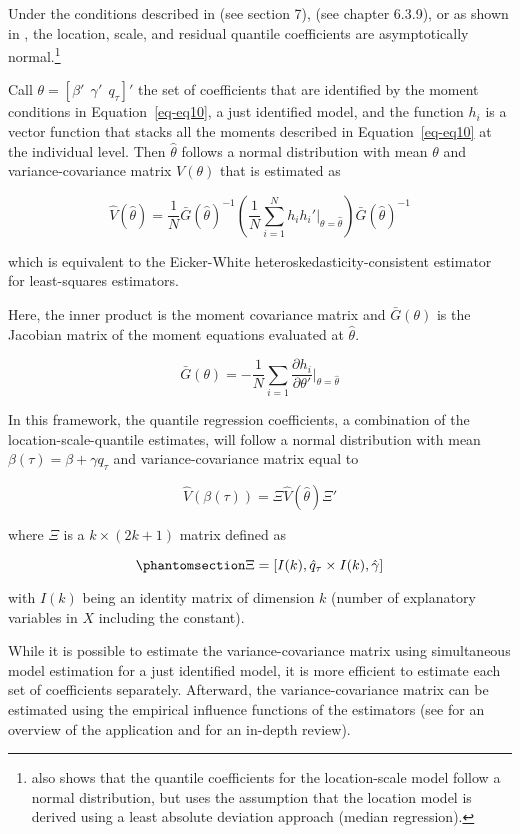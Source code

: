 \documentclass[
  12pt,
  oneside]{article}
\begin{document}
Under the conditions described in \citet{newey_chapter_1994} (see
section 7), \citet{cameron2005} (see chapter 6.3.9), or as shown in
\citet{mss2019}, the location, scale, and residual quantile coefficients
are asymptotically normal.\footnote{\citet{zhao2000} also shows that the
  quantile coefficients for the location-scale model follow a normal
  distribution, but uses the assumption that the location model is
  derived using a least absolute deviation approach (median regression).}

Call \(\theta=[ \beta' \ \ \gamma' \ \ q_\tau ]'\) the set of
coefficients that are identified by the moment conditions in
Equation~\ref{eq-eq10}, a just identified model, and the function
\(h_i\) is a vector function that stacks all the moments described in
Equation~\ref{eq-eq10} at the individual level. Then \(\hat\theta\)
follows a normal distribution with mean \(\theta\) and
variance-covariance matrix \(V(\theta)\) that is estimated as

\[
\hat{V}(\hat\theta)=\frac{1}{N} 
\bar G(\hat\theta)^{-1} 
\left( \frac{1}{N} \sum_{i=1}^N h_i h_i'  \Big|_{\theta=\hat\theta} \right) 
\bar G(\hat\theta)^{-1} 
\]

which is equivalent to the Eicker-White heteroskedasticity-consistent
estimator for least-squares estimators.

Here, the inner product is the moment covariance matrix and
\(\bar{G}(\theta)\) is the Jacobian matrix of the moment equations
evaluated at \(\hat\theta\).

\[\bar{G}(\theta) =-\frac{1}{N} \sum_{i=1} \frac{\partial h_i}{\partial \theta'} \Big|_{\theta=\hat\theta}\]

In this framework, the quantile regression coefficients, a combination
of the location-scale-quantile estimates, will follow a normal
distribution with mean \(\beta(\tau) = \beta+\gamma q_\tau\) and
variance-covariance matrix equal to

\[\hat{V}(\beta(\tau)) = \Xi \hat{V}(\hat\theta) \Xi'
\]

where \(\Xi\) is a \(k \times (2k+1)\) matrix defined as

\begin{equation}\phantomsection\label{eq-eqqtile}{\Xi = [ I(k), \hat q_\tau \times I(k), \hat \gamma ]
}\end{equation}

with \(I(k)\) being an identity matrix of dimension \(k\) (number of
explanatory variables in \(X\) including the constant).

While it is possible to estimate the variance-covariance matrix using
simultaneous model estimation for a just identified model, it is more
efficient to estimate each set of coefficients separately. Afterward,
the variance-covariance matrix can be estimated using the empirical
influence functions of the estimators (see \citet{jann_2020} for an
overview of the application and \citet{hampel2005} for an in-depth
review).
\end{document}
